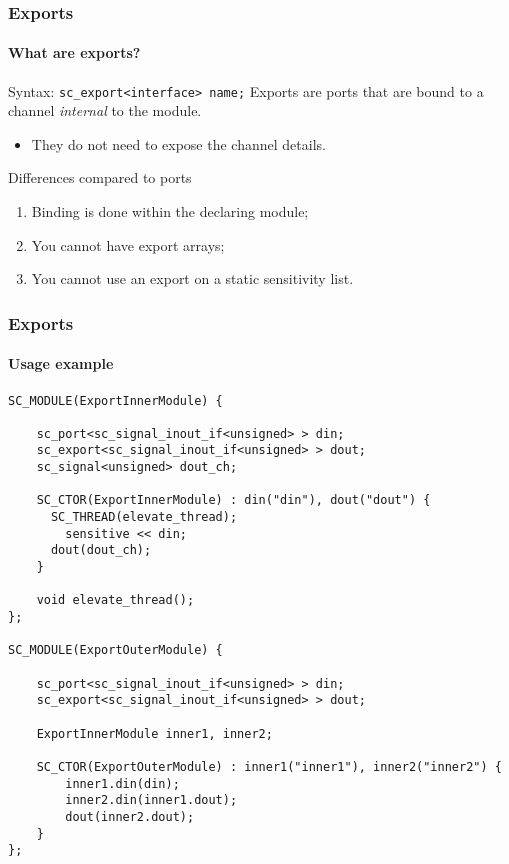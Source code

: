 \begin{frame}[fragile]
\frametitle{Exports}
\framesubtitle{What are exports?}
\begin{block}{Syntax: \texttt{sc\_export<interface> name;}}
Exports are ports that are bound to a channel {\em internal} to the module.
\begin{itemize}
\item They do not need to expose the channel details.
\end{itemize}
\end{block}
\pause
\begin{block}{Differences compared to ports}
\begin{enumerate}
\item Binding is done within the declaring module;
\item You cannot have export arrays;
\item You cannot use an export on a static sensitivity list.
\end{enumerate}
\end{block}

\end{frame}

\begin{frame}[fragile]
\frametitle{Exports}
\framesubtitle{Usage example}
{\tiny 
\begin{verbatim}
SC_MODULE(ExportInnerModule) {

    sc_port<sc_signal_inout_if<unsigned> > din;
    sc_export<sc_signal_inout_if<unsigned> > dout;
    sc_signal<unsigned> dout_ch;

    SC_CTOR(ExportInnerModule) : din("din"), dout("dout") {
      SC_THREAD(elevate_thread);
        sensitive << din;
      dout(dout_ch);
    }
    
    void elevate_thread();
};

SC_MODULE(ExportOuterModule) {

    sc_port<sc_signal_inout_if<unsigned> > din;
    sc_export<sc_signal_inout_if<unsigned> > dout;
    
    ExportInnerModule inner1, inner2;
    
    SC_CTOR(ExportOuterModule) : inner1("inner1"), inner2("inner2") {
        inner1.din(din);
        inner2.din(inner1.dout);
        dout(inner2.dout);
    }
};
\end{verbatim}
}

\end{frame}